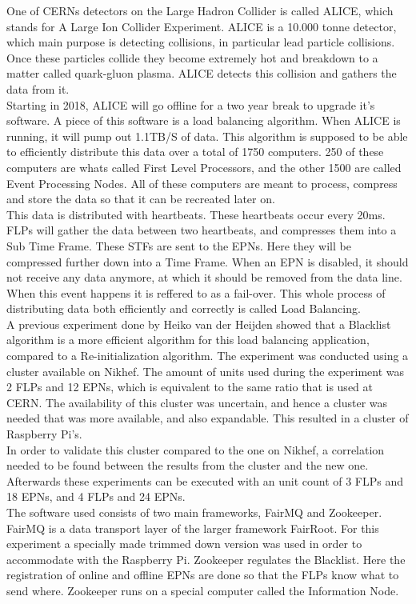 %
One of CERNs detectors on the Large Hadron Collider is called ALICE, which stands for A Large Ion Collider Experiment. ALICE is a 10.000 tonne detector, which main purpose is detecting collisions, in particular lead particle collisions. Once these particles collide they become extremely hot and breakdown to a matter called quark-gluon plasma. ALICE detects this collision and gathers the data from it. \\
Starting in 2018, ALICE will go offline for a two year break to upgrade it's software. A piece of this software is a load balancing algorithm. When ALICE is running, it will pump out 1.1TB/S of data. This algorithm is supposed to be able to efficiently distribute this data over a total of 1750 computers. 250 of these computers are whats called First Level Processors, and the other 1500 are called Event Processing Nodes. All of these computers are meant to process, compress and store the data so that it can be recreated later on. \\
This data is distributed with heartbeats. These heartbeats occur every 20ms. FLPs will gather the data between two heartbeats, and compresses them into a Sub Time Frame. These STFs are sent to the EPNs. Here they will be compressed further down into a Time Frame. When an EPN is disabled, it should not receive any data anymore, at which it should be removed from the data line. When this event happens it is reffered to as a fail-over. This whole process of distributing data both efficiently and correctly is called Load Balancing. \\
A previous experiment done by Heiko van der Heijden showed that a Blacklist algorithm is a more efficient algorithm for this load balancing application, compared to a Re-initialization algorithm. The experiment was conducted using a cluster available on Nikhef. The amount of units used during the experiment was 2 FLPs and 12 EPNs, which is equivalent to the same ratio that is used at CERN. The availability of this cluster was uncertain, and hence a cluster was needed that was more available, and also expandable. This resulted in a cluster of Raspberry Pi's. \\
In order to validate this cluster compared to the one on Nikhef, a correlation needed to be found between the results from the cluster and the new one. Afterwards these experiments can be executed with an unit count of 3 FLPs and 18 EPNs, and 4 FLPs and 24 EPNs. \\
The software used consists of two main frameworks, FairMQ and Zookeeper. FairMQ is a data transport layer of the larger framework FairRoot. For this experiment a specially made trimmed down version was used in order to accommodate with the Raspberry Pi. Zookeeper regulates the Blacklist. Here the registration of online and offline EPNs are done so that the FLPs know what to send where. Zookeeper runs on a special computer called the Information Node. \\
